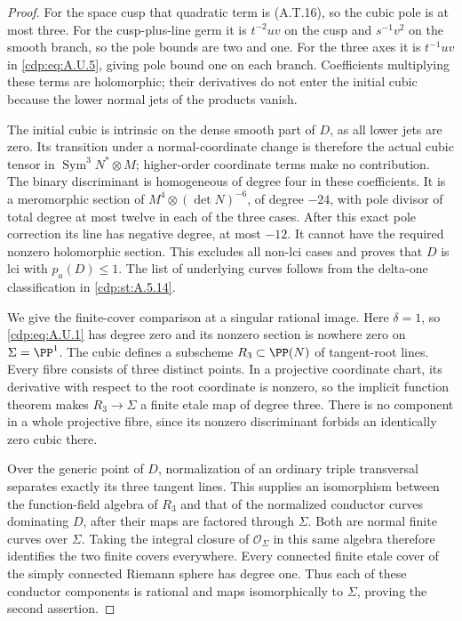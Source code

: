 \begin{proof}
For the space cusp that quadratic term is (A.T.16),
so the cubic pole is at most three. For the
cusp-plus-line germ it is $t^{-2}uv$ on the cusp
and $s^{-1}v^2$ on the smooth branch, so the pole
bounds are two and one. For the three axes it is
$t^{-1}uv$ in \eqref{cdp:eq:A.U.5}, giving pole bound one on
each branch. Coefficients multiplying these terms
are holomorphic; their derivatives do not enter
the initial cubic because the lower normal jets
of the products vanish.

The initial cubic is intrinsic on the dense smooth
part of $D$, as all lower jets are zero. Its
transition under a normal-coordinate change is
therefore the actual cubic tensor in
$\operatorname{Sym}^3N^*\otimes M$; higher-order
coordinate terms make no contribution. The binary
discriminant is homogeneous of degree four in
these coefficients. It is a meromorphic section
of $M^4\otimes(\det N)^{-6}$, of degree $-24$,
with pole divisor of total degree at most twelve
in each of the three cases. After this exact pole
correction its line has negative degree, at most
$-12$. It cannot have the required nonzero
holomorphic section. This excludes all non-lci
cases and proves that $D$ is lci with $p_a(D)\le1$.
The list of underlying curves follows from the
delta-one classification in \ref{cdp:st:A.5.14}.

We give the finite-cover comparison at a singular
rational image. Here $\delta=1$, so \eqref{cdp:eq:A.U.1} has
degree zero and its nonzero section is nowhere zero
on $\Sigma=\PP^1$. The cubic defines a subscheme
$R_3\subset\PP(N)$ of tangent-root lines. Every
fibre consists of three distinct points. In a
projective coordinate chart, its derivative with
respect to the root coordinate is nonzero, so the
implicit function theorem makes
$R_3\to\Sigma$ a finite etale map of degree three.
There is no component in a whole projective fibre,
since its nonzero discriminant forbids an identically
zero cubic there.

Over the generic point of $D$, normalization of an
ordinary triple transversal separates exactly its
three tangent lines. This supplies an isomorphism
between the function-field algebra of $R_3$ and
that of the normalized conductor curves dominating
$D$, after their maps are factored through $\Sigma$.
Both are normal finite curves over $\Sigma$.
Taking the integral closure of $\mathcal O_\Sigma$
in this same algebra therefore identifies the two
finite covers everywhere. Every connected finite
etale cover of the simply connected Riemann sphere
has degree one. Thus each of these conductor
components is rational and maps isomorphically to
$\Sigma$, proving the second assertion.


\end{proof}
